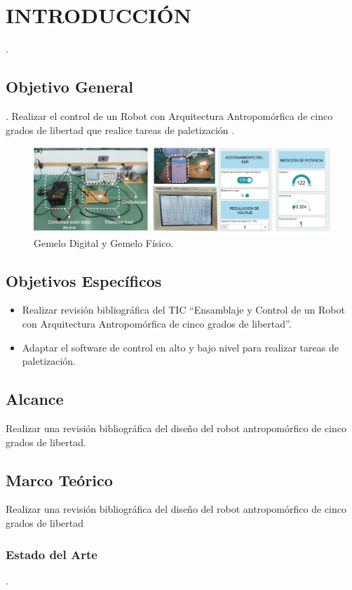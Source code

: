 \chapter{INTRODUCCIÓN}
\lipsum[1-3]\cite{herrera2015sliding}.

\section{Objetivo General}
\lipsum[1-3]\cite{herrera2015sliding}.
Realizar el control de un Robot con Arquitectura Antropomórfica de cinco grados de libertad que realice tareas de paletización \cite{chamorro2020high}.

\begin{figure}[H]
    \centering
    \includegraphics[width=\textwidth]{figuras/testR.png} %
    \caption{Gemelo Digital y Gemelo Físico.}
    \label{fig:gemelo_digital}
\end{figure}



\section{Objetivos Específicos}
\begin{itemize}
    \item Realizar revisión bibliográfica del TIC “Ensamblaje y Control de un Robot con Arquitectura Antropomórfica de cinco grados de libertad”.
    \item Adaptar el software de control en alto y bajo nivel para realizar tareas de paletización.
\end{itemize}

\section{Alcance}
Realizar una revisión bibliográfica del diseño del robot antropomórfico de cinco grados de libertad.

\section{Marco Teórico}
Realizar una revisión bibliográfica del diseño del robot antropomórfico de cinco grados de libertad
\subsection{Estado del Arte}

\lipsum[1-3]\cite{herrera2015sliding}.